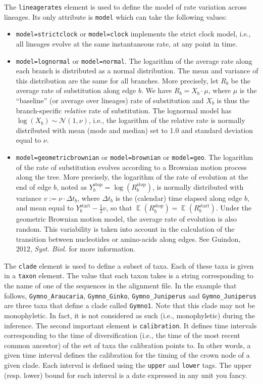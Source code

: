 \documentclass[a4paper,12pt]{article}
\newcommand{\x}[1]{\texttt{#1}}
\DeclareMathOperator*{\Ex}{\mathbb{E}}
\begin{document}
The \x{lineagerates} element is used to define the model of rate
variation across lineages. Its only attribute is \x{model} which can take the following values:
\begin{itemize}
\item \x{model=strictclock} or \x{model=clock}  implements the strict clock model, i.e., all lineages
  evolve at the same instantaneous rate, at any point in time.
\item \x{model=lognormal} or \x{model=normal}. The logarithm of the average rate along each branch is distributed as a
  normal distribution. The mean and variance of this distribution are the same for all branches. More
  precisely, let $R_b$ be the average rate of substitution along edge $b$. We have $R_b=X_b\cdot
  \mu$, where $\mu$ is the ``baseline'' (or average over lineages) rate of substitution and $X_b$ is
  thus the branch-specific {\em relative} rate of substitution. The lognormal model has $\log(X_b)
  \sim \mathcal{N}(1,\nu)$, i.e., the logarithm of the relative rate is normally distributed with
  mean (mode and median) set to 1.0 and standard deviation equal to $\nu$.
\item \x{model=geometricbrownian} or \x{model=brownian} or \x{model=geo}. The logarithm of the rate
  of substitution evolves according to a Brownian motion process along the tree. More precisely, the
  logarithm of the rate of evolution at the end of edge $b$, noted as $Y_b^{\text{stop}}=\log(R_b^{\text{stop}})$, is
  normally distributed with variance $v := \nu \cdot \Delta t_b$, where $\Delta t_b$ is the (calendar) time elapsed
  along edge $b$, and mean equal to $Y_b^{\text{start}}-\frac{1}{2} v$, so that $\Ex(R_b^{\text{stop}})=\Ex(R_b^{\text{start}})$.
  Under the geometric Brownian motion model, the average rate of evolution is also random. This
  variability is taken into account in the calculation of the transition between nucleotides or
  amino-acids along edges. See Guindon, 2012, {\em Syst. Biol.} for more information.
\end{itemize}

The \x{clade} element is used to define a subset of taxa. Each of these taxa is
given in a \x{taxon} element. The  value that each taxon takes is a string corresponding to the
name of one of the sequences in the alignment file. In the example that follows, \x{Gymno\_Araucaria},
\x{Gymno\_Ginko}, \x{Gymno\_Juniperus} and
\x{Gymno\_Juniperus} are three taxa that define a clade called \x{Gymno1}. Note that  this clade may
not be monophyletic. In fact, it is not considered as such (i.e., monophyletic) during the
inference. The second important element is \x{calibration}. It defines time intervals corresponding
to the time of diversification (i.e., the time of the most recent common ancestor) of the set of
taxa the calibration points to. In other words, a given time
interval defines the calibration for the timing of the crown node of a given clade. Each interval is defined using 
the \x{upper} and \x{lower} tags. The upper (resp. lower) bound for each interval is a date
expressed in any unit you fancy.
\end{document}
